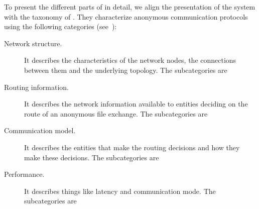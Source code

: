 
To present the different parts of \name in detail, 
we align the presentation of the system with the taxonomy of 
\textcite{RoutingSurveyAnonymousProtocols} .
They characterize anonymous communication protocols using the following 
categories (see~\cite[Table 1]{RoutingSurveyAnonymousProtocols}):
\begin{description}
  \item[Network structure.]
    It describes the characteristics of the network nodes, the connections between 
    them and the underlying topology.
    The subcategories are

  \item[Routing information.]
    It describes the network information available to entities deciding on 
    the route of an anonymous file exchange.
    The subcategories are

  \item[Communication model.]
   It describes the entities that make the routing decisions and how they 
    make these decisions.
    The subcategories are

  \item[Performance.]
    It describes things like latency and communication mode.
    The subcategories are
\end{description}

